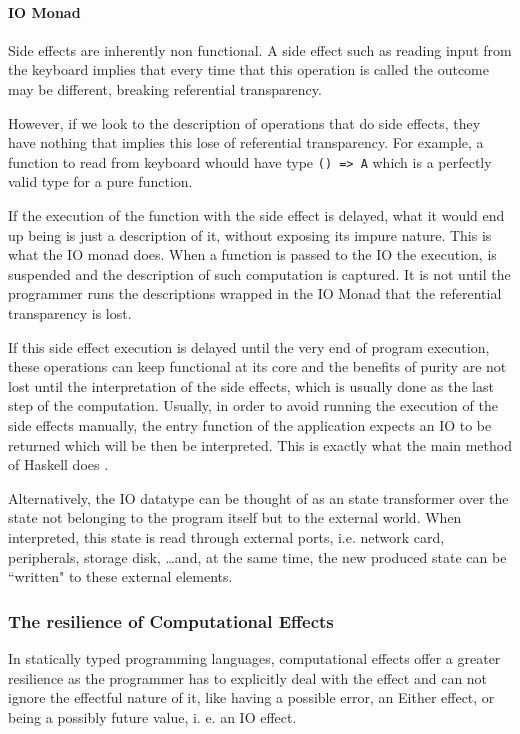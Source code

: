 \documentclass[../main.tex]{subfiles}
\begin{document}


\paragraph{IO Monad}
Side effects are inherently non functional. A side effect such as reading input
from the keyboard implies that every time that this operation is called the
outcome may be different, breaking referential transparency.

However, if we look to the description of operations that do side effects, they
have nothing that implies this lose of referential transparency. For example,
a function to read from keyboard whould have type \texttt{() => A} which is a
perfectly valid type for a pure function.

If the execution of the function with the side effect is delayed, what it
would end up being is just a description of it, without exposing its impure
nature. This is what the IO monad does. When a function is passed to the IO
the execution, is suspended and the description of such computation is captured. It is not
until the programmer runs the descriptions wrapped in the IO Monad that the
referential transparency is lost.

If this side effect execution is delayed until the very end of program execution, these operations
can keep functional at its core and the benefits of purity are not lost until
the interpretation of the side effects, which is usually done as the last step of
the computation. Usually, in order to avoid running the execution of the side
effects manually, the entry function of the application expects an IO to be
returned which will be then be interpreted. This is exactly what the main method
of Haskell does \autocite{AIO}.

Alternatively, the IO datatype can be thought of as an state transformer over 
the state not belonging to the program itself but to the external world. When
interpreted, this state is read through external ports, i.e.
network card, peripherals, storage disk, \ldots and, at the same time, the new produced 
state can be ``written" to these external elements.

\subsubsection{The resilience of Computational Effects}
In statically typed programming languages, computational effects offer a greater resilience as the
programmer has to explicitly deal with the effect and can not ignore the
effectful nature of it, like having a possible error, an Either effect, or being a possibly
future value, i. e. an IO effect.
\end{document}
